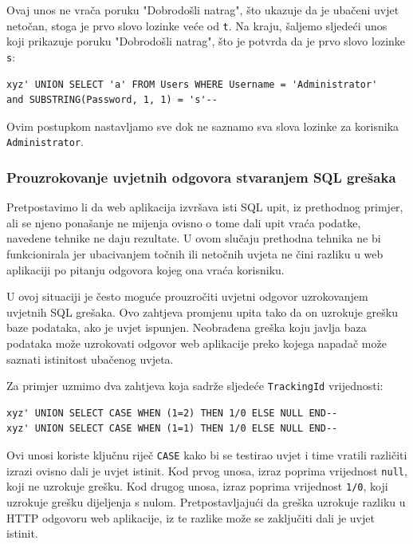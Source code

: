 \documentclass[12pt, oneside, onecolumn]{book}
\begin{document}
{Ovaj unos ne vrača poruku "Dobrodošli natrag", što ukazuje da je ubačeni uvjet netočan, stoga je prvo slovo lozinke veće od \texttt{t}. Na kraju, šaljemo sljedeći unos koji prikazuje poruku "Dobrodošli natrag", što je potvrda da je prvo slovo lozinke \texttt{s}:

\begin{verbatim}
xyz' UNION SELECT 'a' FROM Users WHERE Username = 'Administrator' 
and SUBSTRING(Password, 1, 1) = 's'--
\end{verbatim}

Ovim postupkom nastavljamo sve dok ne saznamo sva slova lozinke za korisnika \texttt{Administrator}.

\subsubsection{Prouzrokovanje uvjetnih odgovora stvaranjem SQL grešaka}
Pretpostavimo li da web aplikacija izvršava isti SQL upit, iz prethodnog primjer, ali se njeno ponašanje ne mijenja ovisno o tome dali upit vraća podatke, navedene tehnike ne daju rezultate. U ovom slučaju prethodna tehnika ne bi funkcionirala jer ubacivanjem točnih ili netočnih uvjeta ne čini razliku u web aplikaciji po pitanju odgovora kojeg ona vraća korisniku.

U ovoj situaciji je često moguće prouzročiti uvjetni odgovor uzrokovanjem uvjetnih SQL grešaka. Ovo zahtjeva promjenu upita tako da on uzrokuje grešku baze podataka, ako je uvjet ispunjen. Neobrađena greška koju javlja baza podataka može uzrokovati odgovor web aplikacije preko kojega napadač može saznati istinitost ubačenog uvjeta.

Za primjer uzmimo dva zahtjeva koja sadrže sljedeće \texttt{TrackingId} vrijednosti:

\begin{verbatim}
xyz' UNION SELECT CASE WHEN (1=2) THEN 1/0 ELSE NULL END--
xyz' UNION SELECT CASE WHEN (1=1) THEN 1/0 ELSE NULL END--
\end{verbatim}

Ovi unosi koriste ključnu riječ \texttt{CASE} kako bi se testirao uvjet i time vratili različiti izrazi ovisno dali je uvjet istinit. Kod prvog unosa, izraz poprima vrijednost \texttt{null}, koji ne uzrokuje grešku. Kod drugog unosa, izraz poprima vrijednost \texttt{1/0}, koji uzrokuje grešku dijeljenja s nulom. Pretpostavljajući da greška uzrokuje razliku u HTTP odgovoru web aplikacije, iz te razlike može se zaključiti dali je uvjet istinit.

}
\end{document}
